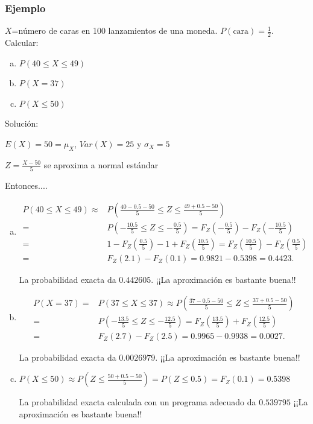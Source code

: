 \begin{frame}
\frametitle{Ejemplo}
    $X$=número de caras en 100 lanzamientos de una moneda.
    $P(\mbox{cara})=\frac{1}{2}$. Calcular:

    \begin{enumerate}[a)]
    \item $P(40\leq X\leq 49)$
    \item $P(X=37)$
    \item $P(X\leq 50)$
    \end{enumerate}
    Solución:

    $E(X)=50=\mu_{X}$, $Var(X)=25$ y $\sigma_{X}=5$

    $Z=\frac{X-50}{5}$   se  aproxima a  normal  estándar

    Entonces....

\end{frame}

\begin{frame}
\begin{enumerate}[a)]
\item     
\[
\begin{array}{rl}
P(40\leq X\leq 49)\approx & P(\frac{40-0.5-50}{5}\leq Z\leq
    \frac{49+0.5-50}{5}) \\ = & P(-\frac{10.5}{5}\leq Z\leq -\frac{0.5}{5})=
    F_{Z}(-\frac{0.5}{5})-  F_{Z}(-\frac{10.5}{5}) \\ = & 
    1-F_{Z}(\frac{0.5}{5})-1+F_{Z}(\frac{10.5}{5})=
F_{Z}(\frac{10.5}{5})-F_{Z}(\frac{0.5}{5}) \\ = & F_{Z}(2.1)-F_{Z}(0.1)=0.9821-0.5398=0.4423.
\end{array}
\]

La probabilidad exacta da $0.442605$. ¡¡La aproximación es bastante buena!!

\item 
\[
\begin{array}{rl}
P(X=37)= & P(37\leq X\leq 37)\approx P(\frac{37-0.5-50}{5}\leq Z\leq
\frac{37+0.5-50}{5}) \\  = & P(-\frac{13.5}{5}\leq Z\leq -\frac{12.5}{5})=
F_{Z}(\frac{13.5}{5})+F_{Z}(\frac{12.5}{5}) \\  = & F_{Z}(2.7)-F_{Z}(2.5)= 0.9965-0.9938=0.0027.
\end{array}
\]

La probabilidad exacta da $0.0026979$. ¡¡La aproximación es bastante buena!!


\item $P(X\leq 50)\approx P(Z\leq \frac{50+0.5-50}{5})=P(Z\leq 0.5)=F_{Z}(0.1)=0.5398$

La probabilidad exacta calculada con un programa adecuado  da $0.539795$ ¡¡La aproximación
es bastante buena!!
\end{enumerate}
\end{frame}

